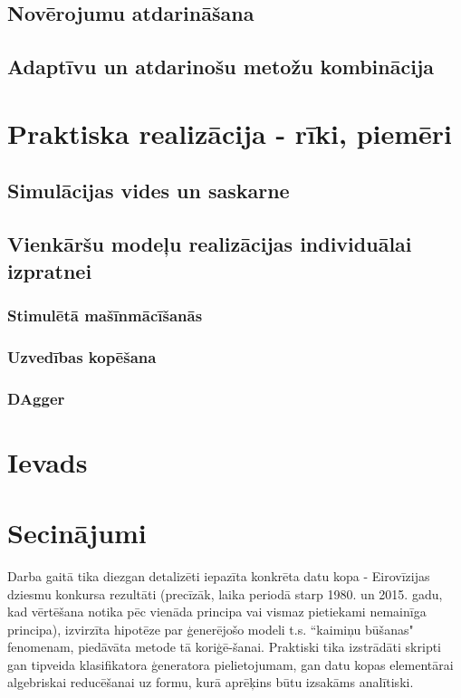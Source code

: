 \documentclass[12pt, a4paper]{article}
\numberwithin{equation}{section} %
\begin{document}
\subsection{Novērojumu atdarināšana}

\subsection{Adaptīvu un atdarinošu metožu kombinācija}


\newpage
\section{Praktiska realizācija - rīki, piemēri}

\subsection{Simulācijas vides un saskarne}

\subsection{Vienkāršu modeļu realizācijas individuālai izpratnei}

\subsubsection{Stimulētā mašīnmācīšanās}

\subsubsection{Uzvedības kopēšana}

\subsubsection{DAgger}

\section{Ievads}

\section*{Secinājumi}

Darba gaitā tika diezgan detalizēti iepazīta konkrēta datu kopa - Eirovīzijas dziesmu konkursa rezultāti (precīzāk, laika periodā starp 1980. un 2015. gadu, kad vērtēšana notika pēc vienāda principa vai vismaz pietiekami nemainīga principa), izvirzīta hipotēze par ģenerējošo modeli t.s. ``kaimiņu būšanas" fenomenam, piedāvāta metode tā koriģē-šanai. Praktiski tika izstrādāti skripti gan tipveida klasifikatora ģeneratora pielietojumam, gan datu kopas elementārai algebriskai reducēšanai uz formu, kurā aprēķins būtu izsakāms analītiski.
\end{document}
